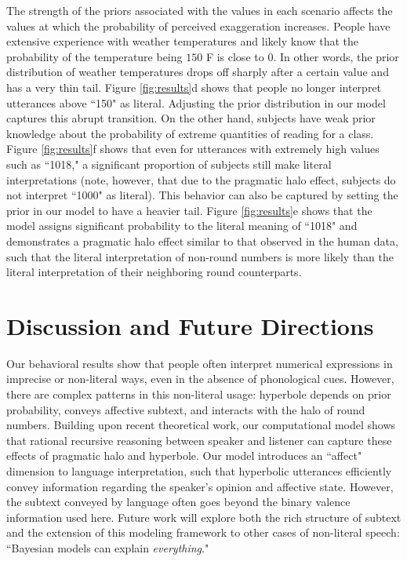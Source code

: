 \documentclass{article} %
\begin{document}
The strength of the priors associated with the values in each scenario affects the values at which the probability of perceived exaggeration increases. People have extensive experience with weather temperatures and likely know that the probability of the temperature being $150$ F is close to $0$. In other words, the prior distribution of weather temperatures drops off sharply after a certain value and has a very thin tail. Figure \ref{fig:results}d shows that people no longer interpret utterances above ``150" as literal. Adjusting the prior distribution in our model captures this abrupt transition.  On the other hand, subjects have weak prior knowledge about the probability of extreme quantities of reading for a class. Figure \ref{fig:results}f shows that even for utterances with extremely high values such as ``1018," a significant proportion of subjects still make literal interpretations (note, however, that due to the pragmatic halo effect, subjects do not interpret ``1000" as literal). This behavior can also be captured by setting the prior in our model to have a heavier tail. Figure \ref{fig:results}e shows that the model assigns significant probability to the literal meaning of ``1018" and demonstrates a pragmatic halo effect similar to that observed in the human data, such that the literal interpretation of non-round numbers is more likely than the literal interpretation of their neighboring round counterparts.

\section{Discussion and Future Directions}

Our behavioral results show that people often interpret numerical expressions in imprecise or non-literal ways, even in the absence of phonological cues. However, there are complex patterns in this non-literal usage: hyperbole depends on prior probability, conveys affective subtext, and interacts with the halo of round numbers.
Building upon recent theoretical work, our computational model shows that rational recursive reasoning between speaker and listener can capture these effects of pragmatic halo and hyperbole. Our model introduces an ``affect" dimension to language interpretation, such that hyperbolic utterances efficiently convey information regarding the speaker's opinion and affective state. However, the subtext conveyed by language often goes beyond the binary valence information used here. Future work will explore both the rich structure of subtext and the extension of this modeling framework to other cases of non-literal speech: ``Bayesian models can explain \emph{everything}."
\end{document}
